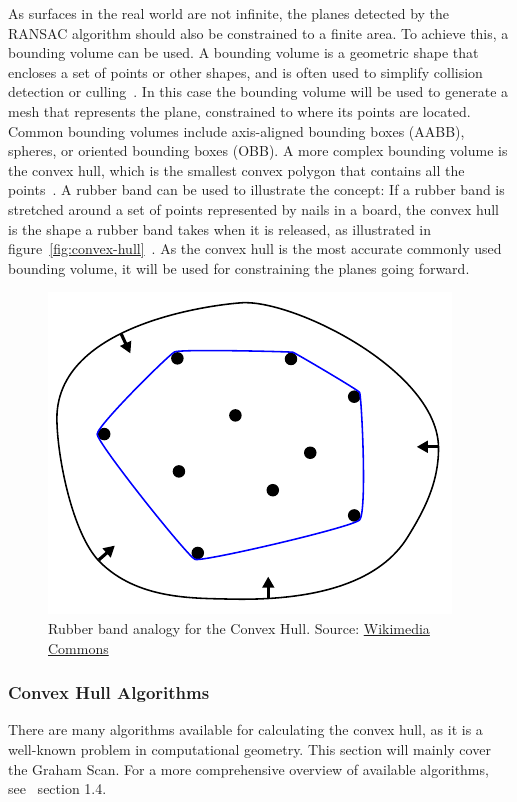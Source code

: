 As surfaces in the real world are not infinite, the planes detected by the RANSAC algorithm should also be constrained to a finite area.
To achieve this, a bounding volume can be used.
A bounding volume is a geometric shape that encloses a set of points or other shapes,
and is often used to simplify collision detection or culling~\cite{gabriel_zachmann_geometric_2002}.
In this case the bounding volume will be used to generate a mesh that represents the plane, constrained to where its points are located.
Common bounding volumes include axis-aligned bounding boxes (AABB), spheres, or oriented bounding boxes (OBB).
A more complex bounding volume is the convex hull, which is the smallest convex polygon that contains all the points~\cite{gabriel_zachmann_geometric_2002}.
A rubber band can be used to illustrate the concept: If a rubber band is stretched around a set of points represented by nails in a board,
the convex hull is the shape a rubber band takes when it is released, as illustrated in figure~\ref{fig:convex-hull}~\cite{de_berg_computational_2008}.
As the convex hull is the most accurate commonly used bounding volume,
it will be used for constraining the planes going forward.

\begin{figure}[ht!]
    \centering
    \includegraphics[width=0.25\linewidth]{images/ConvexHull}
    \caption{Rubber band analogy for the Convex Hull. Source: \href{https://commons.wikimedia.org/wiki/File:ConvexHull.svg}{Wikimedia Commons}}
\end{figure}

\subsubsection{Convex Hull Algorithms}
There are many algorithms available for calculating the convex hull, as it is a well-known problem in computational geometry.
This section will mainly cover the Graham Scan.
For a more comprehensive overview of available algorithms, see~\cite{de_berg_computational_2008} section 1.4.

